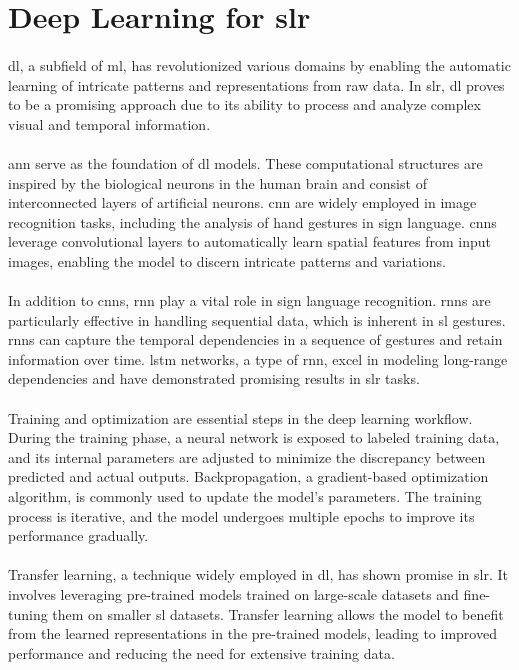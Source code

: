 \section{Deep Learning for \ac{slr}}
\paragraph{}
\ac{dl}, a subfield of \ac{ml}, has revolutionized various domains by enabling the automatic learning of intricate patterns and representations from raw data. In \ac{slr}, \ac{dl} proves to be a promising approach due to its ability to process and analyze complex visual and temporal information.
\paragraph{}
\ac{ann} serve as the foundation of \ac{dl} models. These computational structures are inspired by the biological neurons in the human brain and consist of interconnected layers of artificial neurons. \ac{cnn} are widely employed in image recognition tasks, including the analysis of hand gestures in sign language. \ac{cnn}s leverage convolutional layers to automatically learn spatial features from input images, enabling the model to discern intricate patterns and variations.
\paragraph{}
In addition to \ac{cnn}s, \ac{rnn} play a vital role in sign language recognition. \ac{rnn}s are particularly effective in handling sequential data, which is inherent in \ac{sl} gestures. \ac{rnn}s can capture the temporal dependencies in a sequence of gestures and retain information over time. \ac{lstm} networks, a type of \ac{rnn}, excel in modeling long-range dependencies and have demonstrated promising results in \ac{slr} tasks.
\paragraph{}
Training and optimization are essential steps in the deep learning workflow. During the training phase, a neural network is exposed to labeled training data, and its internal parameters are adjusted to minimize the discrepancy between predicted and actual outputs. Backpropagation, a gradient-based optimization algorithm, is commonly used to update the model's parameters. The training process is iterative, and the model undergoes multiple epochs to improve its performance gradually.
\paragraph{}
Transfer learning, a technique widely employed in \ac{dl}, has shown promise in \ac{slr}. It involves leveraging pre-trained models trained on large-scale datasets and fine-tuning them on smaller \ac{sl} datasets. Transfer learning allows the model to benefit from the learned representations in the pre-trained models, leading to improved performance and reducing the need for extensive training data.
